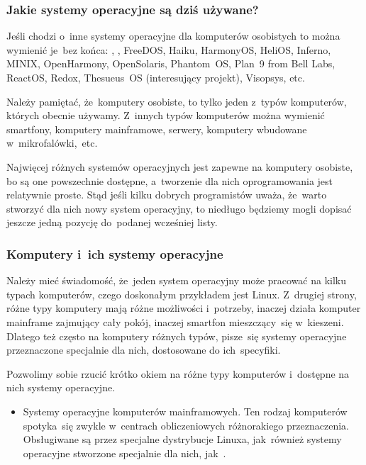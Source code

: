 \documentclass[10pt,t]{beamer}
\begin{document}
\begin{frame}
  \frametitle{Jakie systemy operacyjne są dziś używane?}


  Jeśli chodzi o~inne systemy operacyjne dla komputerów osobistych to
  można wymienić je~bez końca:
  ,
  ,
  FreeDOS, Haiku,
  HarmonyOS, HeliOS, Inferno, MINIX, OpenHarmony, OpenSolaris,
  Phantom~OS, Plan~9 from Bell Labs, ReactOS, Redox, Thesueus~OS
  (interesujący projekt), Visopsys, etc.

  Należy pamiętać, że~komputery osobiste, to tylko jeden z~typów
  komputerów, których obecnie używamy. Z~innych typów komputerów można
  wymienić smartfony, komputery mainframowe, serwery, komputery wbudowane
  w~mikrofalówki,~etc.

  Najwięcej różnych systemów operacyjnych jest zapewne na komputery
  osobiste, bo są one powszechnie dostępne, a~tworzenie dla nich
  oprogramowania jest relatywnie proste. Stąd jeśli kilku dobrych
  programistów uważa, że~warto stworzyć dla nich nowy system operacyjny,
  to niedługo będziemy mogli dopisać jeszcze jedną pozycję do~podanej
  wcześniej listy.

\end{frame}





\begin{frame}
  \frametitle{Komputery i~ich systemy operacyjne}


  Należy mieć świadomość, że~jeden system operacyjny może pracować na kilku
  typach komputerów, czego doskonałym przykładem jest Linux. Z~drugiej
  strony, różne typy komputery mają różne możliwości i~potrzeby, inaczej
  działa komputer mainframe zajmujący cały pokój, inaczej smartfon
  mieszczący~się w~kieszeni. Dlatego też często na komputery różnych typów,
  pisze~się systemy operacyjne przeznaczone specjalnie dla nich, dostosowane
  do ich~specyfiki.

  Pozwolimy sobie rzucić krótko okiem na różne typy komputerów i~dostępne
  na nich systemy operacyjne.

  \begin{itemize}

  \item Systemy operacyjne komputerów mainframowych. Ten rodzaj komputerów
    spotyka~się zwykle w~centrach obliczeniowych różnorakiego
    przeznaczenia. Obsługiwane są przez specjalne dystrybucje Linuxa,
    jak~również systemy operacyjne stworzone specjalnie dla nich,
    jak~.

  \end{itemize}

\end{frame}
\end{document}

